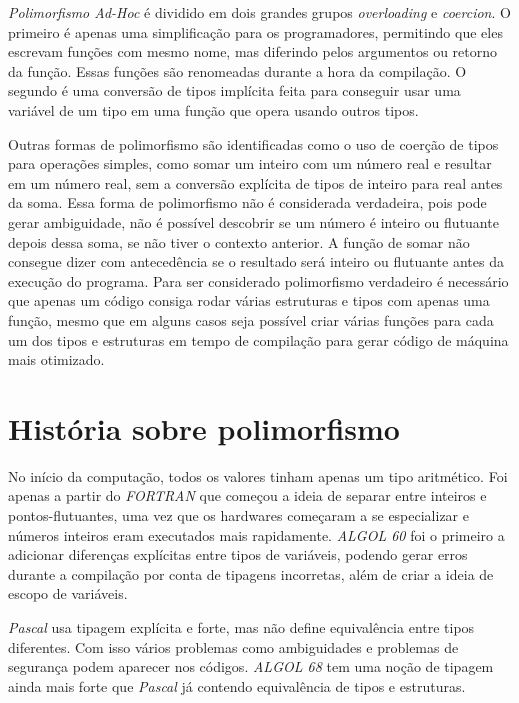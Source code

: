 \documentclass{article}
\begin{document}
\emph{Polimorfismo Ad-Hoc} é dividido em dois grandes grupos \emph{overloading} e \emph{coercion}. O primeiro é apenas uma simplificação para os programadores, permitindo que eles escrevam funções com mesmo nome, mas diferindo pelos argumentos ou retorno da função. Essas funções são renomeadas durante a hora da compilação. O segundo é uma conversão de tipos implícita feita para conseguir usar uma variável de um tipo em uma função que opera usando outros tipos.

Outras formas de polimorfismo são identificadas como o uso de coerção de tipos para operações simples, como somar um inteiro com um número real e resultar em um número real, sem a conversão explícita de tipos de inteiro para real antes da soma. Essa forma de polimorfismo não é considerada verdadeira, pois pode gerar ambiguidade, não é possível descobrir se um número é inteiro ou flutuante depois dessa soma, se não tiver o contexto anterior. A função de somar não consegue dizer com antecedência se o resultado será inteiro ou flutuante antes da execução do programa. 
Para ser considerado polimorfismo verdadeiro é necessário que apenas um código consiga rodar várias estruturas e tipos com apenas uma função, mesmo que em alguns casos seja possível criar várias funções para cada um dos tipos e estruturas em tempo de compilação para gerar código de máquina mais otimizado.

\section{História sobre polimorfismo}

\hspace{10pt} No início da computação, todos os valores tinham apenas um tipo aritmético. Foi apenas a partir do \emph{FORTRAN} que começou a ideia de separar entre inteiros e pontos-flutuantes, uma vez que os hardwares começaram a se especializar e números inteiros eram executados mais rapidamente. \emph{ALGOL 60} foi o primeiro a adicionar diferenças explícitas entre tipos de variáveis, podendo gerar erros durante a compilação por conta de tipagens incorretas, além de criar a ideia de escopo de variáveis.

\emph{Pascal} usa tipagem explícita e forte, mas não define equivalência entre tipos 
diferentes. Com isso vários problemas como ambiguidades e problemas de segurança podem aparecer nos códigos. \emph{ALGOL 68} tem uma noção de tipagem ainda mais forte que \emph{Pascal} já contendo equivalência de tipos e estruturas.
\end{document}
